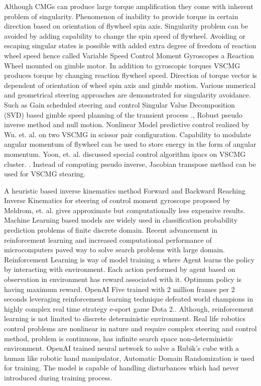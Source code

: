 Although CMGs can produce large torque amplification they come with inherent problem of singularity. Phenomenon of inability to provide torque in certain direction based on orientation of flywheel spin axis. Singularity problem can be avoided by adding capability to change the spin speed of flywheel. Avoiding or escaping singular states is possible with added extra degree of freedom of reaction wheel speed hence called Variable Speed Control Moment Gyroscopes a Reaction Wheel mounted on gimble motor. In addition to gyroscopic torques VSCMG produces torque by changing reaction flywheel speed. Direction of torque vector is dependent of orientation of wheel spin axis and gimble motion. Various numerical and geometrical steering approaches are demonstrated for singularity avoidance. Such as Gain scheduled steering and control \cite{SASAKI2017} Singular Value Decomposition (SVD) based gimble speed planning of the transient process \cite{Huang2016}., Robust pseudo inverse method and null motion. Nonlinear Model predictive control realized by Wu. et. al. on two VSCMG in scissor pair configuration.  Capability to modulate angular momentum of flywheel can be used to store energy in the form of angular momentum. Yoon, et. al. discussed special control algorithm \acrfull{ipacs} on VSCMG cluster. \cite{Yoon2002}. Instead of computing pseudo inverse, Jacobian transpose method can be used for VSCMG stearing. \cite{ KRISHNAN1996431}

A heuristic based inverse kinematics method Forward and Backward Reaching Inverse Kinematics for steering of control moment gyroscope proposed by Meldrom, et. al. gives approximate but computationally less expensive results.\cite{MELDRUM2018}
\\

\noindent Machine Learning based models are widely used in classification probability prediction problems of finite discrete domain. Recent advancement in reinforcement learning and increased computational performance of microcomputers paved way to solve search problems with large domain. Reinforcement Learning is way of model training a where Agent learns the policy by interacting with environment. Each action performed by agent based on observation in environment has reward associated with it. Optimum policy is having maximum reward. OpenAI Five trained with 2 million frames per 2 seconds leveraging reinforcement learning technique defeated world champions in highly complex real time strategy e-sport game Dota 2.\cite{openai2019dota}. Although, reinforcement learning is not limited to discrete deterministic environment. Real life robotics control problems are nonlinear in nature and require complex steering and control method, problem is continuous, has infinite search space non-deterministic environment. OpenAI trained neural network to solve a Rubik’s cube with a human like robotic hand manipulator, Automatic Domain Randomization is used for training. The model is capable of handling disturbances which had never introduced during training process. \cite{openai2019solving}\\

